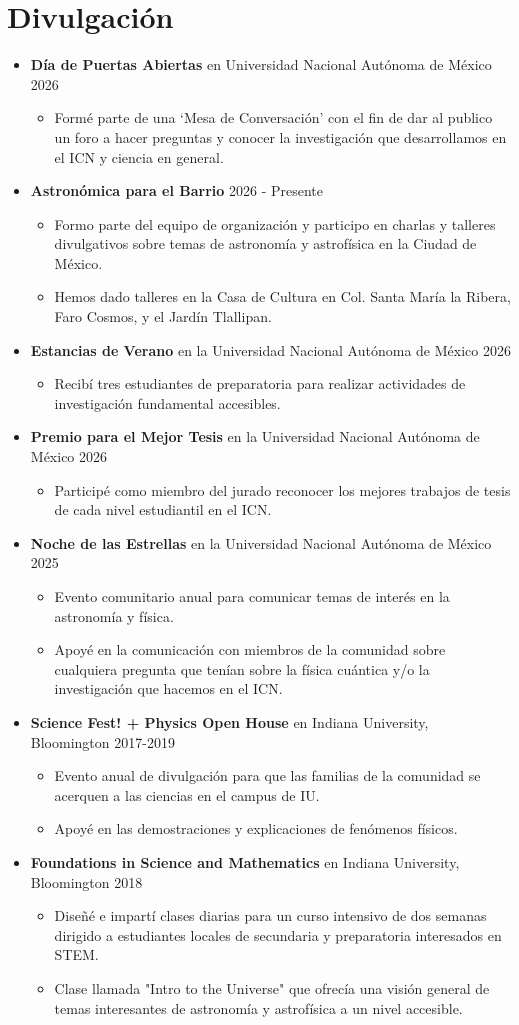 \documentclass[letterpaper,11pt]{article}
\newcommand{\outerlist}[1]{
    \begin{itemize}[leftmargin=*] #1 \end{itemize}}
\newcommand{\innerlist}[1]{
    \begin{itemize}[topsep=0pt] #1 \end{itemize}}
\newcommand{\entry}[1]{\item\small{#1}}
\begin{document}

\section{Divulgación}
\outerlist{
    \entry{\textbf{Día de Puertas Abiertas} en Universidad Nacional Autónoma de México \hfill 2026}
        \innerlist{
        \entry{Formé parte de una `Mesa de Conversación' con el fin de dar al publico un foro a hacer preguntas y conocer la investigación que desarrollamos en el ICN y ciencia en general. }
        }
    \entry{\textbf{Astronómica para el Barrio} \hfill 2026 - Presente}
        \innerlist{
            \entry{Formo parte del equipo de organización y participo en charlas y talleres divulgativos sobre temas de astronomía y astrofísica en la Ciudad de México.}
            \entry{Hemos dado talleres en la Casa de Cultura en Col. Santa María la Ribera, Faro Cosmos, y el Jardín Tlallipan.}
        }
    \entry{\textbf{Estancias de Verano} en la Universidad Nacional Autónoma de México \hfill 2026}
        \innerlist{
            \entry{Recibí tres estudiantes de preparatoria para realizar actividades de investigación fundamental accesibles.}
        }
    \entry{\textbf{Premio para el Mejor Tesis} en la Universidad Nacional Autónoma de México \hfill 2026}
        \innerlist{
            \entry{Participé como miembro del jurado reconocer los mejores trabajos de tesis de cada nivel estudiantil en el ICN.}
        }
    \entry{\textbf{Noche de las Estrellas} en la Universidad Nacional Autónoma de México \hfill 2025}
        \innerlist{
            \entry{Evento comunitario anual para comunicar temas de interés en la astronomía y física.}
            \entry{Apoyé en la comunicación con miembros de la comunidad sobre cualquiera pregunta que tenían sobre la física cuántica y/o la investigación que hacemos en el ICN.}
        }
    \entry{\textbf{Science Fest! + Physics Open House} en Indiana University, Bloomington \hfill 2017-2019}
        \innerlist{
            \entry{Evento anual de divulgación para que las familias de la comunidad se acerquen a las ciencias en el campus de IU.}
            \entry{Apoyé en las demostraciones y explicaciones de fenómenos físicos.}
        }
    \entry{\textbf{Foundations in Science and Mathematics} en Indiana University, Bloomington \hfill 2018}
        \innerlist{
            \entry{Diseñé e impartí clases diarias para un curso intensivo de dos semanas dirigido a estudiantes locales de secundaria y preparatoria interesados en STEM.}
            \entry{Clase llamada "Intro to the Universe" que ofrecía una visión general de temas interesantes de astronomía y astrofísica a un nivel accesible.}
        }
}
\end{document}

